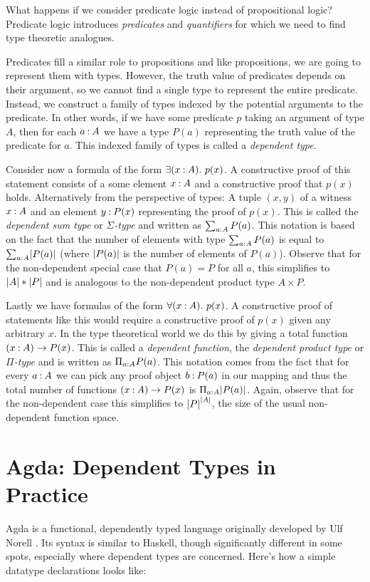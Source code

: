 What happens if we consider predicate logic instead of propositional logic? Predicate logic introduces \emph{predicates} and \emph{quantifiers} for which we need to find type theoretic analogues.

Predicates fill a similar role to propositions and like propositions, we are going to represent them with types. However, the truth value of predicates depends on their argument, so we cannot find a single type to represent the entire predicate. Instead, we construct a family of types indexed by the potential arguments to the predicate. In other words, if we have some predicate $p$ taking an argument of type $A$, then for each $a \mathbin{:} A$ we have a type $P(a)$ representing the truth value of the predicate for $a$. This indexed family of types is called a \emph{dependent type}.

Consider now a formula of the form $\exists (x \mathbin{:} A).~p(x)$. A constructive proof of this statement consists of a some element $x \mathbin{:} A$ and a constructive proof that $p(x)$ holds. Alternatively from the perspective of types: A tuple $(x , y)$ of a witness $x \mathbin{:} A$ and an element $y \mathbin{:} P(x)$ representing the proof of $p(x)$. This is called the \emph{dependent sum type} or $\Sigma$\emph{-type} and written as $\sum_{a \mathbin{:} A}P(a)$. This notation is based on the fact that the number of elements with type $\sum_{a \mathbin{:} A}P(a)$ is equal to $\sum_{a \mathbin{:} A} \lvert P(a)\rvert$ (where $\lvert P(a)\rvert$ is the number of elements of $P(a)$). Observe that for the non-dependent special case that $P(a) = P$ for all $a$, this simplifies to $\lvert A\rvert * \lvert P\rvert$ and is analogous to the non-dependent product type $A \times P$.

Lastly we have formulas of the form $\forall (x \mathbin{:} A).~p(x)$. A constructive proof of statements like this would require a constructive proof of $p(x)$ given any arbitrary $x$. In the type theoretical world we do this by giving a total function $(x \mathbin{:} A) \to P(x)$. This is called a \emph{dependent function}, the \emph{dependent product type} or $\Pi$\emph{-type} and is written as $\Pi_{a \mathbin{:} A} P(a)$. This notation comes from the fact that for every $a \mathbin{:} A$ we can pick any proof object $b \mathbin{:} P(a)$ in our mapping and thus the total number of functions $(x \mathbin{:} A) \to P(x)$ is $\Pi_{a \mathbin{:} A} \lvert P(a)\rvert$. Again, observe that for the non-dependent case this simplifies to ${\lvert P\rvert}^{\lvert A\rvert}$, the size of the usual non-dependent function space.

\section{Agda: Dependent Types in Practice}
Agda is a functional, dependently typed language originally developed by Ulf Norell \cite{norell:thesis}. Its syntax is similar to Haskell, though significantly different in some spots, especially where dependent types are concerned. Here's how a simple datatype declarations looks like:

